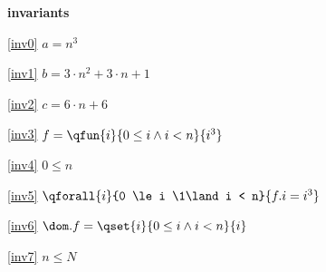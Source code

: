 \textbf{invariants}
\begin{block}
\item[ \eqref{inv0} ]$a = n^3	$ %
\item[ \eqref{inv1} ]$b = 3 \cdot n^2 + 3 \cdot n + 1	$ %
\item[ \eqref{inv2} ]$c = 6 \cdot n + 6	$ %
\item[ \eqref{inv3} ]$f = \qfun{i}{ 0 \le i \land i < n }{ i^3 } $ %
\item[ \eqref{inv4} ]$0 \le n $ %
\item[ \eqref{inv5} ]$\qforall{i}{0 \le i \1\land i < n}{ f.i = i^3 }		$ %
\item[ \eqref{inv6} ]$\dom.f = \qset{i}{0 \le i \land i < n }{ i }		$ %
\item[ \eqref{inv7} ]$n \le N %
	$ %
\end{block}
